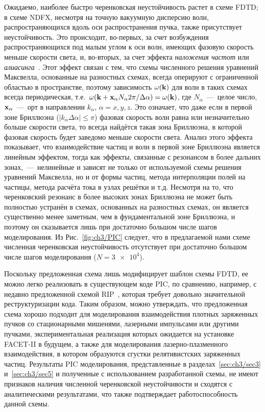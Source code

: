 Ожидаемо, наиболее быстро черенковская неустойчивость растет в схеме FDTD; в схеме NDFX, несмотря на точную вакуумную дисперсию волн, распространяющихся вдоль оси распространения пучка, также присутствует неустойчивость.
Это происходит, во-первых, за счет возбуждения распространяющихся под малым углом к оси волн, имеющих фазовую скорость меньше скорости света, и, во-вторых, за счет эффекта \textit{наложения частот} или \textit{алиасинга}~\cite{Birdsall1989}.
Этот эффект связан с тем, что схемы численного решения уравнений Максвелла, основанные на разностных схемах, всегда оперируют с ограниченной областью в пространстве, поэтому зависимость $\omega(\vb{k})$ для волн в таких схемах всегда периодическая, т.е.~$\omega(\vb{k}+\vb{x}_\alpha N_\alpha 2 \pi / \Delta \alpha)=\omega(\vb{k})$, где $N_\alpha$~---~целое число, $\vb{x}_\alpha$~---~орт в направлении $k_\alpha$, $\alpha=x,y,z$.
Это означает, что даже если в первой зоне Бриллюэна ($|k_\alpha \Delta \alpha|\leq\pi$) фазовая скорость волн равна или незначительно больше скорости света, то всегда найдётся такая зона Бриллюэна, в которой фазовая скорость будет заведомо меньше скорости света.
Анализ этого эффекта показывает, что взаимодействие частиц и волн в первой зоне Бриллюэна является линейным эффектом, тогда как эффекты, связанные с резонансом в более дальних зонах,~---~нелинейные и зависят не только от используемой схемы решения уравнений Максвелла, но и от формы частиц, метода интерполяции полей на частицы, метода расчёта тока в узлах решётки и т.д.
Несмотря на то, что черенковский резонанс в более высоких зонах Бриллюэна не может быть полностью устранён в схемах, основанных на разностных схемах, он является существенно менее заметным, чем в фундаментальной зоне Бриллюэна, и поэтому он сказывается лишь при достаточно большом числе шагов моделирования.
Из Рис.~\ref{fig:ch3/PIC} следует, что в предлагаемой нами схеме численная черенковская неустойчивость отсутствует при достаточно большом числе шагов моделирования ($N = \num{3e4}$).

Поскольку предложенная схема лишь модифицирует шаблон схемы FDTD, ее можно легко реализовать в существующем коде PIC, по сравнению, например, с недавно предложенной схемой RIP~\cite{Pukhov2019}, которая требует довольно значительной реструктуризации кода.
Таким образом, можно утверждать, что предложенная схема хорошо подходит для моделирования взаимодействия плотных заряженных пучков со стационарными мишенями, лазерными импульсами или другими пучками, экспериментальная реализация которых ожидается на установке FACET-II в будущем, а также для моделирования лазерно-плазменного взаимодействия, в котором образуются сгустки релятивистских заряженных частиц.
Результаты PIC моделирования, представленные в разделах~\ref{sec:ch3/sec3} и~\ref{sec:ch3/sec5} и полученные с использованием разработанной схемы, не имеют признаков наличия численной черенковской неустойчивости и сходятся с аналитическими результатами, что также подтверждает работоспособность данной схемы. 

